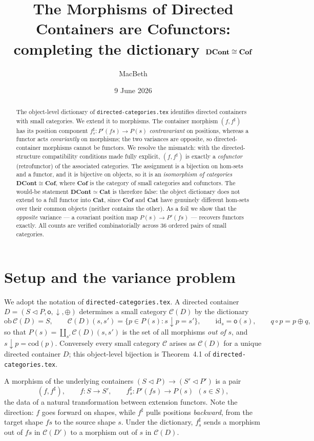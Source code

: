 \documentclass[11pt,a4paper]{article}
\title{\textbf{The Morphisms of Directed Containers are Cofunctors:\\
completing the dictionary $\DCont\cong\Cof$}}
\author{MacBeth}
\date{9 June 2026}
\newcommand{\Cat}{\mathbf{Cat}}
\newcommand{\Cof}{\mathbf{Cof}}
\newcommand{\DCont}{\mathbf{DCont}}
\newcommand{\cont}[2]{#1 \triangleleft #2}
\newcommand{\id}{\mathrm{id}}
\newcommand{\cod}{\mathrm{cod}}
\newcommand{\ob}{\mathrm{ob}\,}
\theoremstyle{definition}\newtheorem{definition}{Definition}[section]
\theoremstyle{plain}\newtheorem{proposition}[definition]{Proposition}
\theoremstyle{remark}\newtheorem{example}[definition]{Example}
\begin{document}
\maketitle

\begin{abstract}
The object-level dictionary of \texttt{directed-categories.tex} identifies
directed containers with small categories. We extend it to morphisms. The
container morphism $(f,f^\sharp)$ has its position component
$f^\sharp_s\colon P'(fs)\to P(s)$ \emph{contravariant} on positions, whereas a
functor acts \emph{covariantly} on morphisms; the two variances are opposite,
so directed-container morphisms cannot be functors. We resolve the mismatch:
with the directed-structure compatibility conditions made fully explicit,
$(f,f^\sharp)$ is exactly a \emph{cofunctor} (retrofunctor) of the associated
categories. The assignment is a bijection on hom-sets and a functor, and it is
bijective on objects, so it is an \emph{isomorphism of categories}
$\DCont\cong\Cof$, where $\Cof$ is the category of small categories and
cofunctors. The would-be statement $\DCont\simeq\Cat$ is therefore false: the
object dictionary does not extend to a full functor into $\Cat$, since
$\Cof$ and $\Cat$ have genuinely different hom-sets over their common objects
(neither contains the other). As a foil we show that the \emph{opposite}
variance --- a covariant position map $P(s)\to P'(fs)$ --- recovers functors
exactly. All counts are verified combinatorially across $36$ ordered pairs of
small categories.
\end{abstract}

\section{Setup and the variance problem}

We adopt the notation of \texttt{directed-categories.tex}. A directed container
$D=(\cont SP,\mathsf o,\downarrow,\oplus)$ determines a small category
$\mathcal C(D)$ by the dictionary
\[
  \ob\mathcal C(D)=S,\qquad
  \mathcal C(D)(s,s')=\{p\in P(s): s\downarrow p=s'\},\qquad
  \id_s=\mathsf o(s),\qquad q\circ p = p\oplus q,
\]
so that $P(s)=\coprod_{s'}\mathcal C(D)(s,s')$ is the set of all morphisms
\emph{out of} $s$, and $s\downarrow p=\cod(p)$. Conversely every small category
$\mathcal C$ arises as $\mathcal C(D)$ for a unique directed container $D$;
this object-level bijection is Theorem~4.1 of \texttt{directed-categories.tex}.

A morphism of the underlying containers
$(\cont SP)\to(\cont{S'}{P'})$ is a pair
\[
  (f,f^\sharp),\qquad f\colon S\to S',\qquad
  f^\sharp_s\colon P'(fs)\to P(s)\ \ (s\in S),
\]
the data of a natural transformation between extension functors. Note the
direction: $f$ goes forward on shapes, while $f^\sharp$ pulls positions
\emph{backward}, from the target shape $fs$ to the source shape $s$. Under the
dictionary, $f^\sharp_s$ sends a morphism out of $fs$ in $\mathcal C(D')$ to a
morphism out of $s$ in $\mathcal C(D)$.
\end{document}
